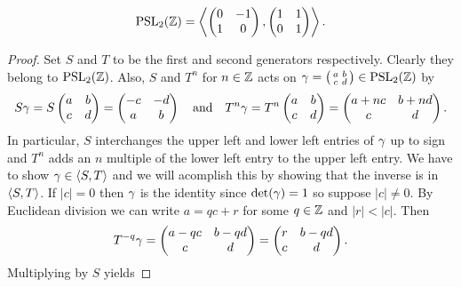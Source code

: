       \begin{proposition}\label{prop:PSL_generator}
          \[
            \mathrm{PSL}_{2}(\mathbb{Z}) = \left\langle\begin{pmatrix} 0 &-1 \\ 1 & 0 \end{pmatrix},\begin{pmatrix} 1 & 1 \\ 0 & 1 \end{pmatrix} \right\rangle.
          \]
      \end{proposition}
      \begin{proof}
        Set $S$ and $T$ to be the first and second generators respectively. Clearly they belong to $\mathrm{PSL}_{2}(\mathbb{Z})$. Also, $S$ and $T^{n}$ for $n \in \mathbb{Z}$ acts on $\gamma = \begin{psmallmatrix} a & b \\ c & d \end{psmallmatrix} \in \mathrm{PSL}_{2}(\mathbb{Z})$ by
        \[
          S\gamma = S\begin{pmatrix} a & b \\ c & d \end{pmatrix} = \begin{pmatrix} -c & -d \\ a & b \end{pmatrix} \quad \text{and} \quad T^{n}\gamma = T^{n}\begin{pmatrix} a & b \\ c & d \end{pmatrix} = \begin{pmatrix} a+nc & b+nd \\ c & d \end{pmatrix}.
        \]
        In particular, $S$ interchanges the upper left and lower left entries of $\gamma$ up to sign and $T^{n}$ adds an $n$ multiple of the lower left entry to the upper left entry. We have to show $\gamma \in \langle S,T\rangle$ and we will acomplish this by showing that the inverse is in $\langle S,T\rangle$. If $|c| = 0$ then $\gamma$ is the identity since $\det(\gamma) = 1$ so suppose $|c| \neq 0$. By Euclidean division we can write $a = qc+r$ for some $q \in \mathbb{Z}$ and $|r| < |c|$. Then
        \[
          T^{-q}\gamma = \begin{pmatrix} a-qc & b-qd \\ c & d \end{pmatrix} = \begin{pmatrix} r & b-qd \\ c & d \end{pmatrix}.
        \]
        Multiplying by $S$ yields

\end{proof}

